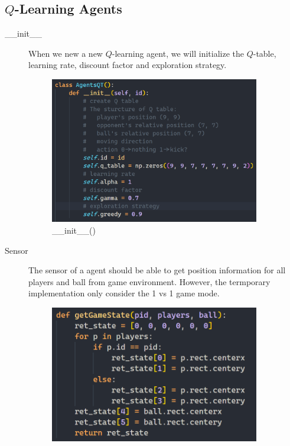 \documentclass[14pt]{extarticle}
\begin{document}
\subsection{$Q$-Learning Agents}
\begin{description}
    \item[\_\_init\_\_]
    When we new a new $Q$-learning agent, we will initialize the $Q$-table, learning rate, discount factor and exploration strategy. 
    \begin{figure}[H]
		\begin{center}
			\includegraphics[width=0.9\textwidth]{init_qlearn.png}
			\caption{\_\_init\_\_()}
		\end{center}
	\end{figure}
    \item[Sensor]
    The sensor of a agent should be able to get position information for all players and ball from game environment. However, the termporary implementation only consider the 1 vs 1 game mode.
    \begin{figure}[H]
		\begin{center}
			\includegraphics[width=0.9\textwidth]{get_game_state.png}

\end{center}
\end{figure}
\end{description}
\end{document}
